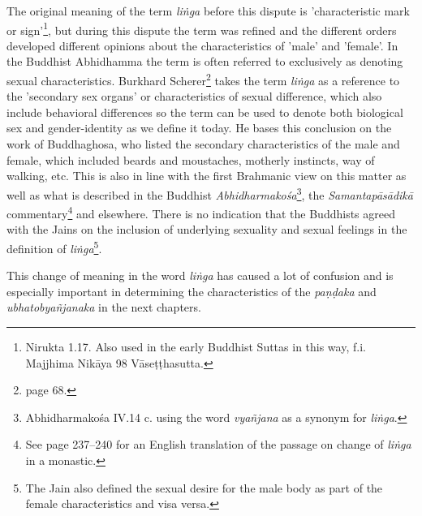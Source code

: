The original meaning of the term {\em liṅga} before this dispute is 'characteristic mark or sign'\footnote{Nirukta 1.17. Also used in the early Buddhist Suttas in this way, f.i. Majjhima Nikāya 98 Vāseṭṭhasutta.}, but during this dispute the term was refined and the different orders developed different opinions about the characteristics of 'male' and 'female'. In the Buddhist Abhidhamma the term is often referred to exclusively as denoting sexual characteristics. Burkhard Scherer\footnote{\cite{scherer} page 68.} takes the term {\em liṅga} as a reference to the 'secondary sex organs' or characteristics of sexual difference, which also include behavioral differences so the term can be used to denote both biological sex and gender-identity as we define it today. He bases this conclusion on the work of Buddhaghosa, who listed the secondary characteristics of the male and female, which included beards and moustaches, motherly instincts, way of walking, etc. This is also in line with the first Brahmanic view on this matter as well as what is described in the Buddhist {\em Abhidharmakośa}\footnote{Abhidharmakośa IV.14 c. using the word {\em vyañjana} as a synonym for {\em liṅga}.}, the {\em Samantapāsādikā} commentary\footnote{See \cite{anderson2016} page 237–240 for an English translation of the passage on change of {\em liṅga} in a monastic.} and elsewhere. There is no indication that the Buddhists agreed with the Jains on the inclusion of underlying sexuality and sexual feelings in the definition of {\em liṅga}\footnote{The Jain also defined the sexual desire for the male body as part of the female characteristics and visa versa.}.

This change of meaning in the word {\em liṅga} has caused a lot of confusion and is especially important in determining the characteristics of the {\em paṇḍaka} and {\em ubhatob­yañ­janaka} in the next chapters.
